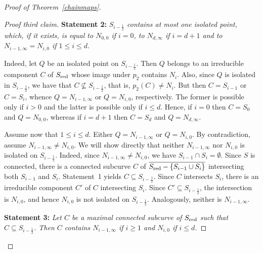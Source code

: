 \documentclass[a4paper,11pt]{amsart}
\theoremstyle{plain}
\theoremstyle{definition}
\theoremstyle{remark}
\def\red{\text{\rm red}}
\begin{document}
\begin{proof}[Proof of Theorem~\ref{chainmaps}]
\begin{proof}[Proof third claim]
\vskip0.1cm

{\bf Statement 2:} {\it $S_{i-\frac{1}{2}}$ contains at most one isolated point, which, if it exists, is equal to $N_{0,0}$ if $i=0$, to $N_{d,\infty}$ if $i=d+1$ and to $N_{i-1,\infty}= N_{i,0}$ if $1\leq i\leq d$.}

Indeed, let $Q$ be an isolated point on $S_{i-\frac{1}{2}}$. Then $Q$ belongs to an irreducible component $C$ of $S_\red$ whose image under $p_2$ contains $N_i$. Also, since $Q$ is isolated in $S_{i-\frac{1}{2}}$, we have that $C\not\subseteq S_{i-\frac{1}{2}}$, that is, $p_2(C)\neq N_i$. But then $C=S_{i-1}$ or $C=S_i$, whence $Q=N_{i-1,\infty}$ or $Q=N_{i,0}$, respectively. The former is possible only if $i>0$ and the latter is possible only if $i\leq d$. Hence, if $i=0$ then $C=S_0$ and $Q=N_{0,0}$, whereas if $i=d+1$ then $C=S_d$ and $Q=N_{d,\infty}$.

Assume now that $1\leq i\leq d$. Either $Q=N_{i-1,\infty}$ or $Q=N_{i,0}$. By contradiction, assume $N_{i-1,\infty}\neq N_{i,0}$. We will show directly that neither $N_{i-1,\infty}$ nor $N_{i,0}$ is isolated on $S_{i-\frac{1}{2}}$. Indeed, since $N_{i-1,\infty}\neq N_{i,0}$, we have $S_{i-1}\cap S_i=\emptyset$. Since $S$ is connected, there is a connected subcurve $C$ of $\overline{S_\red-\{S_{i-1}\cup S_i\}}$ intersecting both $S_{i-1}$ and $S_i$. Statement~1 yields $C\subseteq S_{i-\frac{1}{2}}$. Since $C$ intersects $S_i$, there is an irreducible component $C'$ of $C$ intersecting $S_i$. Since $C'\subseteq S_{i-\frac{1}{2}}$, the intersection is $N_{i,0}$, and hence $N_{i,0}$ is not isolated on $S_{i-\frac{1}{2}}$. Analogously, neither is $N_{i-1,\infty}$. 

\vskip0.1cm

{\bf Statement 3:} {\it Let $C$ be a maximal connected subcurve of $S_\red$ such that $C\subseteq S_{i-\frac{1}{2}}$. Then $C$ contains 
$N_{i-1,\infty}$ if $i\geq 1$ and $N_{i,0}$ if $i\leq d$.}


\end{proof}
\end{proof}
\end{document}

